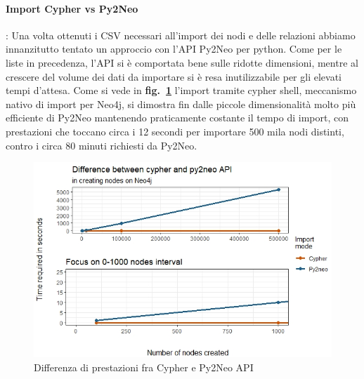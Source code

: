 \documentclass[fleqn,10pt]{SelfArx} %
\begin{document}
{\paragraph{Import Cypher vs Py2Neo}: Una volta ottenuti i CSV necessari all'import dei nodi e delle relazioni abbiamo innanzitutto tentato un approccio con l'API Py2Neo per python. Come per le liste in precedenza, l'API si è comportata bene sulle ridotte dimensioni, mentre al crescere del volume dei dati da importare si è resa inutilizzabile per gli elevati tempi d'attesa. Come si vede in \textbf{fig.~\ref{plot_cypher_py2neo}} l'import tramite cypher shell, meccanismo nativo di import per Neo4j, si dimostra fin dalle piccole dimensionalità molto più efficiente di Py2Neo mantenendo praticamente costante il tempo di import, con prestazioni che toccano circa i 12 secondi per importare 500 mila nodi distinti, contro i circa 80 minuti richiesti da Py2Neo.
\begin{figure}
\centering
\includegraphics[scale=0.54]{viz_benchmark_cypher_py2neo.jpeg}
\caption{\label{plot_cypher_py2neo} Differenza di prestazioni fra Cypher e Py2Neo API}
\end{figure}
}
\end{document}
